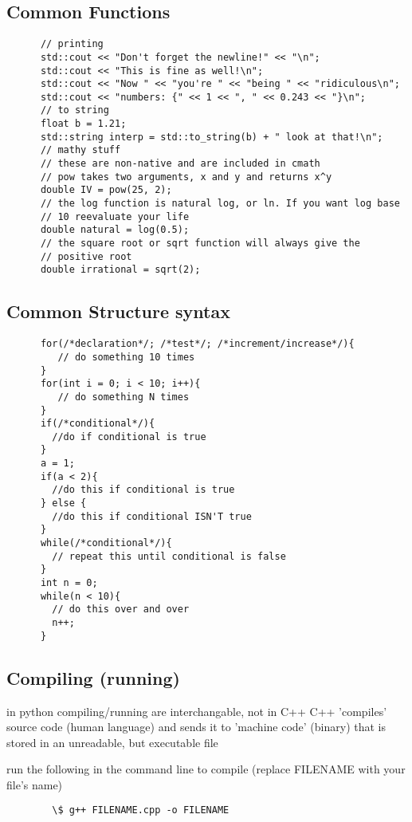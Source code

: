 \documentclass[12pt]{article}
\begin{document}
  \subsection{Common Functions}
    \begin{lstlisting}
      // printing
      std::cout << "Don't forget the newline!" << "\n";
      std::cout << "This is fine as well!\n";
      std::cout << "Now " << "you're " << "being " << "ridiculous\n";
      std::cout << "numbers: {" << 1 << ", " << 0.243 << "}\n";
      // to string
      float b = 1.21;
      std::string interp = std::to_string(b) + " look at that!\n";
      // mathy stuff
      // these are non-native and are included in cmath
      // pow takes two arguments, x and y and returns x^y
      double IV = pow(25, 2);
      // the log function is natural log, or ln. If you want log base
      // 10 reevaluate your life
      double natural = log(0.5);
      // the square root or sqrt function will always give the
      // positive root
      double irrational = sqrt(2);
    \end{lstlisting}
  \subsection{Common Structure syntax}
    \begin{lstlisting}
      for(/*declaration*/; /*test*/; /*increment/increase*/){
         // do something 10 times 
      }
      for(int i = 0; i < 10; i++){
         // do something N times 
      }
      if(/*conditional*/){
        //do if conditional is true
      }
      a = 1;
      if(a < 2){
        //do this if conditional is true
      } else {
        //do this if conditional ISN'T true
      }
      while(/*conditional*/){
        // repeat this until conditional is false
      }
      int n = 0;
      while(n < 10){
        // do this over and over
        n++;
      }
    \end{lstlisting}
  \subsection{Compiling (running)}
      in python compiling/running are interchangable, not in C++
      C++ 'compiles' source code (human language) and sends it 
      to 'machine code' (binary) that is stored in an
      unreadable, but executable file

      run the following in the command line to compile (replace
      FILENAME with your file's name)
      \begin{verbatim}
        \$ g++ FILENAME.cpp -o FILENAME
      \end{verbatim}
      
\end{document}
